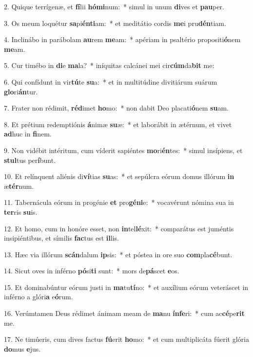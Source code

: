 2. Quique terrígenæ, et \textbf{fí}lii \textbf{hó}\textbf{mi}num:~*  simul in unum \textbf{di}ves et \textbf{pau}per.\

3. Os meum loquétur \textbf{sa}pi\textbf{én}\textbf{ti}am:~*  et meditátio cordis \textbf{me}i pru\textbf{dén}tiam.\

4. Inclinábo in parábolam \textbf{au}rem \textbf{me}am:~*  apériam in psaltério propositi\textbf{ó}nem \textbf{me}am.\

5. Cur timébo in \textbf{di}e \textbf{ma}la?~*  iníquitas calcánei mei cir\textbf{cúm}da\textbf{bit} me:\

6. Qui confídunt in vir\textbf{tú}te \textbf{su}a:~*  et in multitúdine divitiárum suárum \textbf{glo}ri\textbf{án}tur.\

7. Frater non rédimit, \textbf{réd}imet \textbf{ho}mo:~*  non dabit Deo placati\textbf{ó}nem \textbf{su}am.\

8. Et prétium redemptiónis \textbf{á}nimæ \textbf{su}æ:~*  et laborábit in ætérnum, et vivet \textbf{ad}huc in \textbf{fi}nem.\

9. Non vidébit intéritum, cum víderit sapiéntes \textbf{mo}ri\textbf{én}tes:~*  simul insípiens, et \textbf{stul}tus per\textbf{í}bunt.\

10. Et relínquent aliénis di\textbf{ví}tias \textbf{su}as:~*  et sepúlcra eórum domus illórum \textbf{in} æ\textbf{tér}num.\

11. Tabernácula eórum in progénie \textbf{et} pro\textbf{gé}\textbf{ni}e:~*  vocavérunt nómina sua in \textbf{ter}ris \textbf{su}is.\

12. Et homo, cum in honóre esset, non \textbf{in}tel\textbf{lé}xit:~*  comparátus est juméntis insipiéntibus, et símilis \textbf{fac}tus est \textbf{il}lis.\

13. Hæc via illórum \textbf{scán}dalum \textbf{ip}sis:~*  et póstea in ore suo \textbf{com}pla\textbf{cé}bunt.\

14. Sicut oves in inférno \textbf{pó}si\textbf{ti} sunt:~*  mors de\textbf{pá}scet \textbf{e}os.\

15. Et dominabúntur eórum justi in \textbf{ma}tu\textbf{tí}no:~*  et auxílium eórum veteráscet in inférno a glóri\textbf{a} e\textbf{ó}rum.\

16. Verúmtamen Deus rédimet ánimam meam de \textbf{ma}nu \textbf{ín}\textbf{fe}ri:~*  cum ac\textbf{cé}pe\textbf{rit} me.\

17. Ne timúeris, cum dives factus \textbf{fú}erit \textbf{ho}mo:~*  et cum multiplicáta fúerit glória \textbf{do}mus \textbf{e}jus.\


